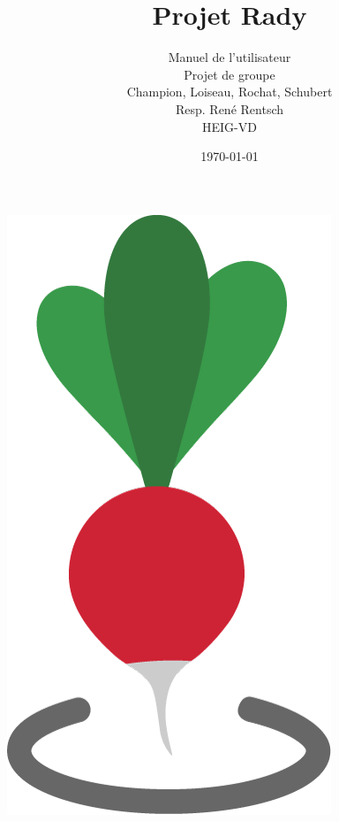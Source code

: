 \documentclass[french]{article}
\begin{document}
	
	
	\title{Projet Rady} %
	\author{Manuel de l'utilisateur\\ 
		Projet de groupe\\
		Champion, Loiseau, Rochat, Schubert\\
		Resp. René Rentsch\\
		HEIG-VD}
	\date{\today} %
	\maketitle
	\vspace{2cm}
	\centering
	\includegraphics[scale=0.3]{../logo/icone}
	\thispagestyle{empty}
	
	\newpage
	\thispagestyle{empty}
	$ $
	\newpage
	
	\justify
	\normalsize
	
	\tableofcontents
	
\end{document}
